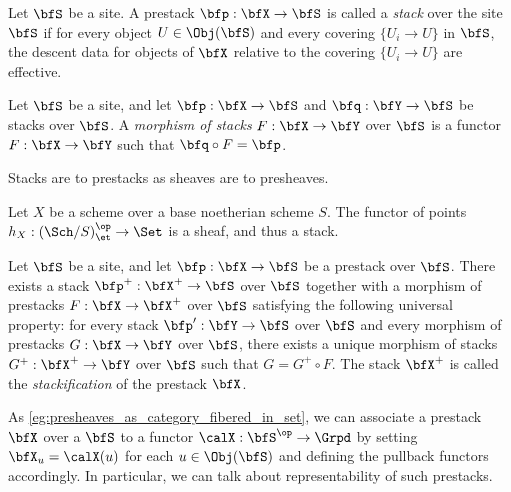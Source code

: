     \begin{definition}%
        Let \(\bfS\) be a site.
        A prestack \(\bfp: \bfX \to \bfS\) is called a \emph{stack} over the site \(\bfS\) if for every object \(U \in \Obj(\bfS)\) and every covering \(\{ U_i \to U \}\) in \(\bfS\), the descent data for objects of \(\bfX\) relative to the covering \(\{ U_i \to U \}\) are effective.
    \end{definition}

    \begin{definition}%
        Let \(\bfS\) be a site, and let \(\bfp: \bfX \to \bfS\) and \(\bfq: \bfY \to \bfS\) be stacks over \(\bfS\).
        A \emph{morphism of stacks} \(F: \bfX \to \bfY\) over \(\bfS\) is a functor \(F: \bfX \to \bfY\) such that \(\bfq \circ F = \bfp\).
    \end{definition}

    \begin{slogan}%
        Stacks are to prestacks as sheaves are to presheaves.
    \end{slogan}

    \begin{example}%
        Let \(X\) be a scheme over a base noetherian scheme \(S\).
        The functor of points \(h_X: (\Sch/S)_{\et}^{\op} \to \Set\) is a sheaf, and thus a stack.
    \end{example}

    \begin{construction}%
        Let \(\bfS\) be a site, and let \(\bfp: \bfX \to \bfS\) be a prestack over \(\bfS\).
        There exists a stack \(\bfp^{+}: \bfX^{+} \to \bfS\) over \(\bfS\) together with a morphism of prestacks \(F: \bfX \to \bfX^{+}\) over \(\bfS\) satisfying the following universal property:
        for every stack \(\bfp': \bfY \to \bfS\) over \(\bfS\) and every morphism of prestacks \(G: \bfX \to \bfY\) over \(\bfS\),
        there exists a unique morphism of stacks \(G^{+}: \bfX^{+} \to \bfY\) over \(\bfS\) such that \(G = G^{+} \circ F\).
        The stack \(\bfX^{+}\) is called the \emph{stackification} of the prestack \(\bfX\).
    \end{construction}


    \begin{notation}
        As \cref{eg:presheaves_as_category_fibered_in_set}, we can associate a prestack \(\bfX\) over a \(\bfS\) to a functor \(\calX: \bfS^{\op} \to \Grpd\) by setting \(\bfX_u = \calX(u)\) for each \(u \in \Obj(\bfS)\) and defining the pullback functors accordingly.
        In particular, we can talk about representability of such prestacks.
    \end{notation}

